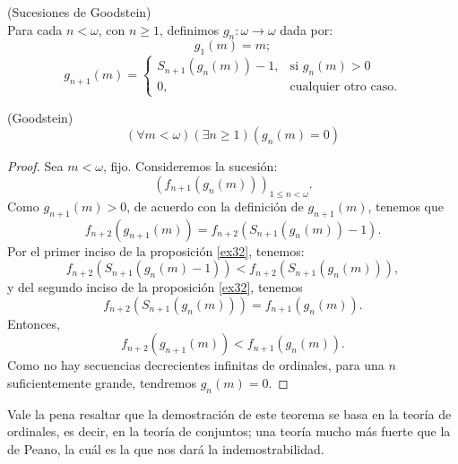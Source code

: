 \begin{defn}\label{d39}
    (Sucesiones de Goodstein)\\
    Para cada $n<\omega$, con $n\geq1$, definimos $g_n:\omega\longrightarrow\omega$ dada por:
    \[g_1(m)=m;\]
    \[
        g_{n+1}(m)=
        \begin{cases}
        S_{n+1}(g_n(m))-1, & \text{si }g_n(m)>0\\
        0,&\text{cualquier otro caso.} 
        \end{cases}
    \]
\end{defn}
\begin{thm}\label{t40}
    (Goodstein)
    \[(\forall m<\omega)(\exists n\geq 1)(g_n(m)=0)\]
\end{thm}
\begin{proof}
    Sea $m<\omega$, fijo. Consideremos la sucesión:
    \[{(f_{n+1}(g_n(m)))}_{1\leq n<\omega}.\]
    Como $g_{n+1}(m)>0$, de acuerdo con la definición de $g_{n+1}(m)$, tenemos que 
    \[f_{n+2}(g_{n+1}(m))=f_{n+2}(S_{n+1}(g_n(m))-1).\]
    Por el primer inciso de la proposición {\ref{ex32}}, tenemos:
    \[f_{n+2}(S_{n+1}(g_n(m)-1))<f_{n+2}(S_{n+1}(g_n(m))),\]
    y del segundo inciso de la proposición {\ref{ex32}}, tenemos
    \[f_{n+2}(S_{n+1}(g_n(m)))=f_{n+1}(g_n(m)).\]
    Entonces, \[f_{n+2}(g_{n+1}(m))<f_{n+1}(g_n(m)).\]
    Como no hay secuencias decrecientes infinitas de ordinales, para una $n$ suficientemente grande, tendremos $g_n(m)=0$.
\end{proof}
Vale la pena resaltar que la demostración de este teorema se basa en la teoría de ordinales, es decir, en la teoría de conjuntos; una teoría mucho más fuerte que la de Peano, la cuál es la que nos dará la indemostrabilidad.